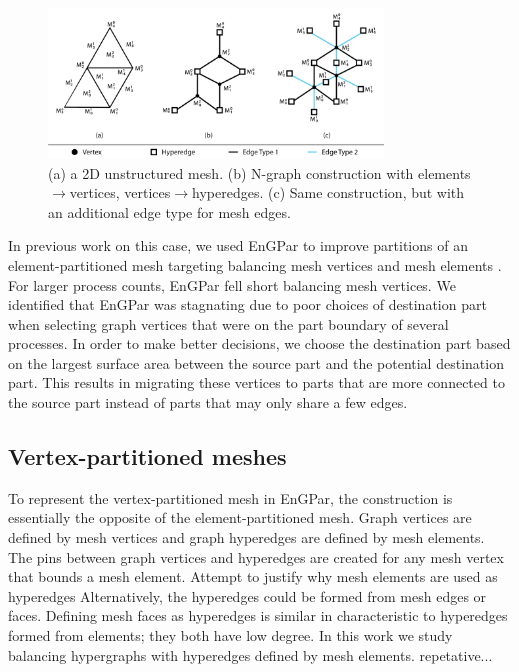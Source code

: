 \documentclass[conference]{IEEEtran}
\begin{document}
\begin{figure}[!ht]
  \centering
  \includegraphics[width=3.5in]{../figures/exampleMesh2Graph.png}
  \caption{(a) a 2D unstructured mesh. (b) N-graph construction with elements$\rightarrow$vertices, vertices$\rightarrow$hyperedges. (c) Same construction, but with an additional edge type for mesh edges.}
  \label{fig:mesh2graph}
\end{figure}

In previous work on this case, we used EnGPar to improve partitions of an
element-partitioned mesh targeting balancing mesh vertices and mesh elements \cite{engparSC17}.
For larger process counts, EnGPar fell short balancing mesh vertices.
We identified that EnGPar was stagnating due to poor choices of destination part
when selecting graph vertices that were on the part boundary of several processes. In order
to make better decisions, we choose the destination part based on the largest surface area
between the source part and the potential destination part. This results in migrating these
vertices to parts that are more connected to the source part instead of parts that may only
share a few edges.

\subsection{Vertex-partitioned meshes}\label{sec:vtxPtn}

To represent the vertex-partitioned mesh in EnGPar, the construction
is essentially the opposite of the element-partitioned mesh. Graph
vertices are defined by mesh vertices and graph hyperedges are defined
by mesh elements. The pins between graph vertices and hyperedges are
created for any mesh vertex that bounds a mesh element.
{\color{red} Attempt to justify why mesh elements are used as hyperedges}
Alternatively, the hyperedges could be formed from mesh edges or faces.
Defining mesh faces as hyperedges is similar in characteristic to hyperedges
formed from elements; they both have low degree.
In this work we study balancing hypergraphs with hyperedges defined by mesh
elements. {\color{red} repetative...}
\end{document}
